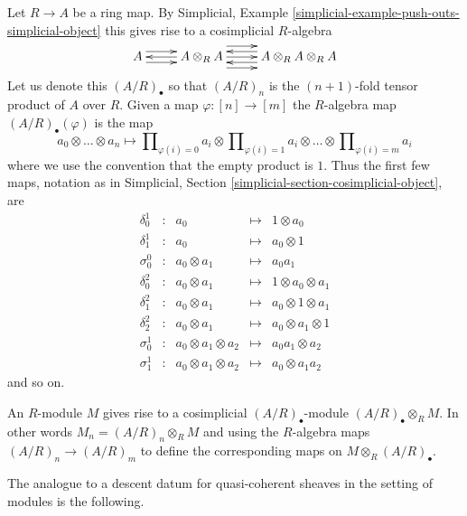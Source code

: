\noindent
Let $R \to A$ be a ring map.
By Simplicial, Example \ref{simplicial-example-push-outs-simplicial-object}
this gives rise to a cosimplicial $R$-algebra
$$
\xymatrix{
A
\ar@<1ex>[r]
\ar@<-1ex>[r]
&
A \otimes_R A
\ar@<0ex>[l]
\ar@<2ex>[r]
\ar@<0ex>[r]
\ar@<-2ex>[r]
&
A \otimes_R A \otimes_R A
\ar@<1ex>[l]
\ar@<-1ex>[l]
}
$$
Let us denote this $(A/R)_\bullet$ so that $(A/R)_n$ is the $(n + 1)$-fold
tensor product of $A$ over $R$. Given a map
$\varphi : [n] \to [m]$ the $R$-algebra map $(A/R)_\bullet(\varphi)$
is the map
$$
a_0 \otimes \ldots \otimes a_n
\longmapsto
\prod\nolimits_{\varphi(i) = 0} a_i
\otimes
\prod\nolimits_{\varphi(i) = 1} a_i
\otimes \ldots \otimes
\prod\nolimits_{\varphi(i) = m} a_i
$$
where we use the convention that the empty product is $1$. Thus the first
few maps, notation as in
Simplicial, Section \ref{simplicial-section-cosimplicial-object}, are
$$
\begin{matrix}
\delta^1_0 & : & a_0 & \mapsto & 1 \otimes a_0 \\
\delta^1_1 & : & a_0 & \mapsto & a_0 \otimes 1 \\
\sigma^0_0 & : & a_0 \otimes a_1 & \mapsto & a_0a_1 \\
\delta^2_0 & : & a_0 \otimes a_1 & \mapsto & 1 \otimes a_0 \otimes a_1 \\
\delta^2_1 & : & a_0 \otimes a_1 & \mapsto & a_0 \otimes 1 \otimes a_1 \\
\delta^2_2 & : & a_0 \otimes a_1 & \mapsto & a_0 \otimes a_1 \otimes 1 \\
\sigma^1_0 & : & a_0 \otimes a_1 \otimes a_2 & \mapsto & a_0a_1 \otimes a_2 \\
\sigma^1_1 & : & a_0 \otimes a_1 \otimes a_2 & \mapsto & a_0 \otimes a_1a_2
\end{matrix}
$$
and so on.

\medskip\noindent
An $R$-module $M$ gives rise to a cosimplicial $(A/R)_\bullet$-module
$(A/R)_\bullet \otimes_R M$. In other words
$M_n = (A/R)_n \otimes_R M$ and using the $R$-algebra maps
$(A/R)_n \to (A/R)_m$ to define the corresponding maps on
$M \otimes_R (A/R)_\bullet$.

\medskip\noindent
The analogue to a descent datum
for quasi-coherent sheaves in the setting of modules is the following.


